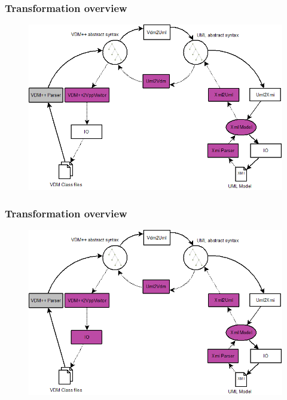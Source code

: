 {
  \frametitle{Transformation overview}
\begin{center}
\begin{figure}
\includegraphics[width=\textwidth]{images/OverviewOverMappingToUML4.png}
\end{figure}
\end{center}
}
%
%
\frame
{
  \frametitle{Transformation overview}
\begin{center}
\begin{figure}
\includegraphics[width=\textwidth]{images/OverviewOverMappingToUML5.png}
\end{figure}
\end{center}
}
